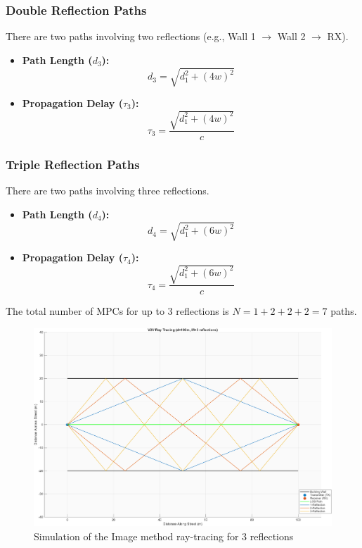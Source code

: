 \subsubsection{Double Reflection Paths}
There are two paths involving two reflections (e.g., Wall 1 $\rightarrow$ Wall 2 $\rightarrow$ RX).
\begin{itemize}
	\item \textbf{Path Length ($d_3$):}
	\begin{equation}
		d_3 = \sqrt{d_1^2 + (4w)^2}
	\end{equation}
	\item \textbf{Propagation Delay ($\tau_{3}$):}
	\begin{equation}
		\tau_{3} = \frac{\sqrt{d_1^2 + (4w)^2}}{c}
	\end{equation}
\end{itemize}

\subsubsection{Triple Reflection Paths}
There are two paths involving three reflections.
\begin{itemize}
	\item \textbf{Path Length ($d_4$):}
	\begin{equation}
		d_4 = \sqrt{d_1^2 + (6w)^2}
	\end{equation}
	\item \textbf{Propagation Delay ($\tau_{4}$):}
	\begin{equation}
		\tau_{4} = \frac{\sqrt{d_1^2 + (6w)^2}}{c}
	\end{equation}
\end{itemize}
The total number of MPCs for up to 3 reflections is $N=1+2+2+2=7$ paths.

\begin{figure}[H]
	\centering
	\includegraphics[width=\linewidth]{content/4-images/ray-tracing-3-reflect}
	\caption{Simulation of the Image method ray-tracing for 3 reflections}
	\label{fig:raytracing-3reflex}
\end{figure}


